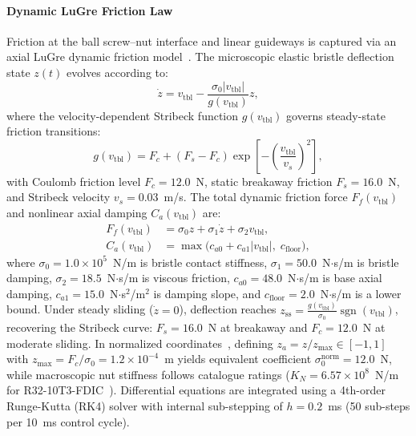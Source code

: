 \documentclass[a4paper,fleqn]{cas-dc}
\begin{document}
\paragraph{Dynamic LuGre Friction Law}
Friction at the ball screw--nut interface and linear guideways is captured via an axial LuGre dynamic friction model~\cite{PriorWork_MSSP_2026, Wan_2025}. The microscopic elastic bristle deflection state $z(t)$ evolves according to:
\begin{equation}
    \dot{z} = v_{\mathrm{tbl}} - \frac{\sigma_0 |v_{\mathrm{tbl}}|}{g(v_{\mathrm{tbl}})} z,
    \label{eq:lugre_state_eq}
\end{equation}
where the velocity-dependent Stribeck function $g(v_{\mathrm{tbl}})$ governs steady-state friction transitions:
\begin{equation}
    g(v_{\mathrm{tbl}}) = F_c + (F_s - F_c) \exp\left[-\left(\frac{v_{\mathrm{tbl}}}{v_s}\right)^2\right],
    \label{eq:stribeck_func}
\end{equation}
with Coulomb friction level $F_c = 12.0$~N, static breakaway friction $F_s = 16.0$~N, and Stribeck velocity $v_s = 0.03$~m/s. The total dynamic friction force $F_f(v_{\mathrm{tbl}})$ and nonlinear axial damping $C_a(v_{\mathrm{tbl}})$ are:
\begin{align}
    F_f(v_{\mathrm{tbl}}) &= \sigma_0 z + \sigma_1 \dot{z} + \sigma_2 v_{\mathrm{tbl}}, \label{eq:lugre_force_eq} \\
    C_a(v_{\mathrm{tbl}}) &= \max\bigl(c_{a0} + c_{a1}|v_{\mathrm{tbl}}|, \; c_{\mathrm{floor}}\bigr), \label{eq:viscous_floor}
\end{align}
where $\sigma_0 = 1.0 \times 10^5$~N/m is bristle contact stiffness, $\sigma_1 = 50.0$~N$\cdot$s/m is bristle damping, $\sigma_2 = 18.5$~N$\cdot$s/m is viscous friction, $c_{a0} = 48.0$~N$\cdot$s/m is base axial damping, $c_{a1} = 15.0$~N$\cdot$s$^2$/m$^2$ is damping slope, and $c_{\mathrm{floor}} = 2.0$~N$\cdot$s/m is a lower bound. Under steady sliding ($\dot{z} = 0$), deflection reaches $z_{\mathrm{ss}} = \frac{g(v_{\mathrm{tbl}})}{\sigma_0} \operatorname{sgn}(v_{\mathrm{tbl}})$, recovering the Stribeck curve: $F_s = 16.0$~N at breakaway and $F_c = 12.0$~N at moderate sliding. In normalized coordinates~\cite{PriorWork_MSSP_2026}, defining $z_a = z / z_{\mathrm{max}} \in [-1, 1]$ with $z_{\mathrm{max}} = F_c / \sigma_0 = 1.2 \times 10^{-4}$~m yields equivalent coefficient $\sigma_0^{\mathrm{norm}} = 12.0$~N, while macroscopic nut stiffness follows catalogue ratings ($K_N = 6.57 \times 10^8$~N/m for R32-10T3-FDIC~\cite{PMI_Catalog}). Differential equations are integrated using a 4th-order Runge-Kutta (RK4) solver with internal sub-stepping of $h = 0.2$~ms (50 sub-steps per 10~ms control cycle).
\end{document}
